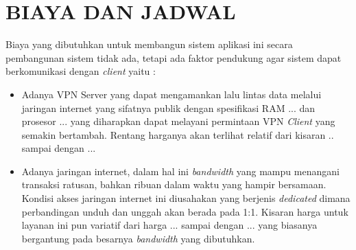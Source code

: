 \chapter{BIAYA DAN JADWAL}

Biaya yang dibutuhkan untuk membangun sistem aplikasi ini secara pembangunan sistem tidak ada, tetapi ada faktor pendukung agar sistem dapat berkomunikasi dengan \textit{client} yaitu :

\begin{itemize}
  \item Adanya VPN Server yang dapat mengamankan lalu lintas data melalui jaringan internet yang sifatnya publik dengan spesifikasi RAM ... dan prosesor ... yang diharapkan dapat melayani permintaan VPN \textit{Client} yang semakin bertambah. Rentang harganya akan terlihat relatif dari kisaran .. sampai dengan ...
   
  \item Adanya jaringan internet, dalam hal ini \textit{bandwidth} yang mampu menangani transaksi ratusan, bahkan ribuan dalam waktu yang hampir bersamaan. Kondisi akses jaringan internet ini diusahakan yang berjenis \textit{dedicated} dimana perbandingan unduh dan unggah akan berada pada 1:1. Kisaran harga untuk layanan ini pun variatif dari harga ... sampai dengan ... yang biasanya bergantung pada besarnya \textit{bandwidth} yang dibutuhkan.
  
\end{itemize}
